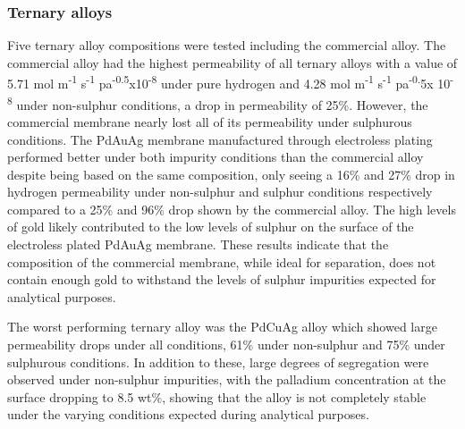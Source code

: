 \subsubsection{Ternary alloys}
Five ternary alloy compositions were tested including the commercial alloy. The commercial alloy had the highest permeability of all ternary alloys with a value of 5.71 mol m\textsuperscript{-1} s\textsuperscript{-1} pa\textsuperscript{-0.5}x10\textsuperscript{-8} under pure hydrogen and 4.28 mol m\textsuperscript{-1} s\textsuperscript{-1} pa\textsuperscript{-0.}5x 10\textsuperscript{-8}  under non-sulphur conditions, a drop in permeability of 25\%. However, the commercial membrane nearly lost all of its permeability under sulphurous conditions. The PdAuAg membrane manufactured through electroless plating performed better under both impurity conditions than the commercial alloy despite being based on the same composition, only seeing a 16\% and 27\% drop in hydrogen permeability under non-sulphur and sulphur conditions respectively compared to a 25\% and 96\% drop shown by the commercial alloy. The high levels of gold likely contributed to the low levels of sulphur on the surface of the electroless plated PdAuAg membrane. These results indicate that the composition of the commercial membrane, while ideal for separation, does not contain enough gold to withstand the levels of sulphur impurities expected for analytical purposes. 

The worst performing ternary alloy was the PdCuAg alloy which showed large permeability drops under all conditions, 61\% under non-sulphur and 75\% under sulphurous conditions. In addition to these, large degrees of segregation were observed under non-sulphur impurities, with the palladium concentration at the surface dropping to 8.5 wt\%, showing that the alloy is not completely stable under the varying conditions expected during analytical purposes.  

